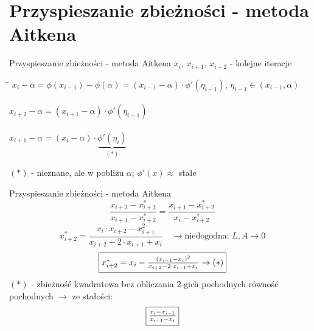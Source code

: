 \section{Przyspieszanie zbieżności - metoda Aitkena}
\begin{frame}{Przyspieszanie zbieżności - metoda Aitkena}
	$x_{i}$, $x_{i+1}$, $x_{i+2}$ - kolejne iteracje\linebreak
	\begin{tabbing}
		\quad \= $x_{i} - \alpha = \phi(x_{i-1}) - \phi(\alpha) = (x_{i-1} - \alpha) \cdot \phi'(\eta_{i-1})$, \quad $\eta_{i-1} \in (x_{i-1}, \alpha)$\\\\
		\> $x_{i+2} - \alpha = (x_{i+1} - \alpha) \cdot \phi'(\eta_{i+1})$\\\\
		\> $x_{i+1} - \alpha = (x_{i} - \alpha) \cdot \underbrace{\phi'(\eta_{i})}_{(*)}$
	\end{tabbing}
	$(*)$ - nieznane, ale w pobliżu $\alpha$; $\phi'(x) \approx$ stałe
\end{frame}
\begin{frame}{Przyspieszanie zbieżności - metoda Aitkena}
	\[
		\frac{x_{i+2} - x_{i+2}^{*}}{x_{i+1} - x_{i+2}^{*}} = \frac{x_{i+1} - x_{i+2}^{*}}{x_{i} - x_{i+2}^{*}}
	\]
	\[
		x_{i+2}^{*} = \frac{x_{i} \cdot x_{i+2} - x_{i+1}^{2}}{x_{i+2} - 2 \cdot x_{i+1} + x_{i}} \quad \rightarrow \text{niedogodna: } L, A \rightarrow 0
	\]
	\[
		\fbox{$x_{i+2}^{*} = x_{i} - \frac{(x_{i+1} - x_{i})^{2}}{x_{i+2} - 2 \cdot x_{i+1} + x_{i}} \rightarrow (*)$}
	\]
	$(*)$ - zbieżność kwadratowa bez obliczania 2-gich pochodnych\linebreak\linebreak
	równość pochodnych \quad $\rightarrow$ \quad ze stałości:\linebreak
	\[
		\fbox{$\frac{x_{i} - x_{i-1}}{x_{i+1} - x_{i}}$}
	\]
\end{frame}